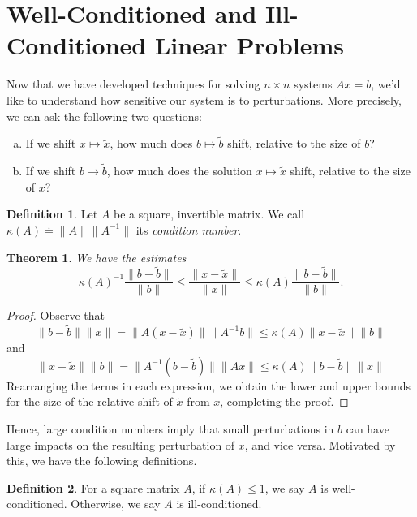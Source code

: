 \documentclass[12pt]{article}
\theoremstyle{plain}
\newtheorem{theorem}{Theorem}
\theoremstyle{definition}
\newtheorem*{definition}{Definition}
\theoremstyle{remark}
\numberwithin{equation}{section}  %
\begin{document}
\section{Well-Conditioned and Ill-Conditioned Linear Problems}
Now that we have developed techniques for solving $n \times n$
systems $Ax = b$, we'd like to understand how sensitive our system
is to perturbations. More precisely, we can ask the following two questions:
\begin{enumerate}[a)]
\item If we shift $x \mapsto \tilde{x}$, how much does $b \mapsto 
\tilde{b}$ shift, relative to the size of $b$?
\item If we shift $b \to \tilde{b}$, how much does the solution $x \mapsto
\tilde{x}$ shift, relative to the size of $x$?
\end{enumerate}
\begin{definition}
Let $A$ be a square, invertible matrix. We call $\kappa(A) \doteq \| A \| \| A^{-1} \|$
its \emph{condition number}.
\end{definition}
\begin{theorem}
We have the estimates
\begin{equation*}
\kappa(A)^{-1} \frac{\| b - \tilde{b}\|}{\| b\|} \le \frac{\| x - \tilde{x} \|}{\| x \|}
\le \kappa(A) \frac{ \| b - \tilde{b} \|}{ \| b \| }.
\end{equation*}
\end{theorem}
\begin{proof}
Observe that
\begin{equation*}
\| b - \tilde{b} \| \| x \| = \| A(x - \tilde{x})\| \| A^{-1}b \| 
\le \kappa(A) \| x - \tilde{x} \| \| b \|
\end{equation*}
and
\begin{equation*}
\| x - \tilde{x} \| \| b \| = \| A^{-1}(b - \tilde{b})\| \| Ax \| 
\le \kappa(A) \| b - \tilde{b} \| \| x \|
\end{equation*}
Rearranging the terms in each expression, we obtain the lower and upper
bounds for the size of the relative shift of $\tilde{x}$ from $x$, completing
the proof.
\end{proof}
Hence, large condition numbers imply that small perturbations in $b$ can have
large impacts on the resulting perturbation of $x$, and vice versa.
Motivated by this, we have the following definitions.
\begin{definition}
For a square matrix $A$, if $\kappa(A) \le 1$, we say $A$ is well-conditioned.
Otherwise, we say $A$ is ill-conditioned.
\end{definition}
\end{document}
